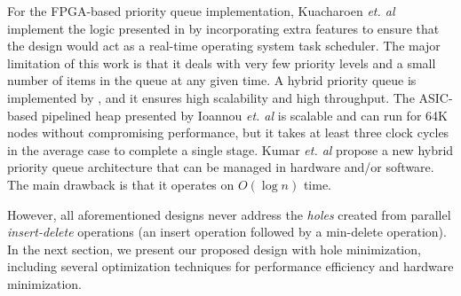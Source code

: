 For the FPGA-based priority queue implementation, Kuacharoen {\it et. al} \cite{fpga3} implement the logic presented in \cite{hw3} by incorporating extra features to ensure that the design would act as a real-time operating system task scheduler.
The major limitation of this work is that it deals with very few priority levels and a small number of items in the queue at any given time.
A hybrid priority queue is implemented by \cite{fpga2}, and it ensures high scalability and high throughput.
The ASIC-based pipelined heap presented by Ioannou {\it et. al} \cite{fpga1} is scalable and can run for 64K nodes without compromising performance, but it takes at least three clock cycles in the average case to complete a single stage.
Kumar {\it et. al} \cite{hwsw1} propose a new hybrid priority queue architecture that can be managed in hardware and/or software.
The main drawback is that it operates on $O(\log n)$ time.

However, all aforementioned designs never address the {\it holes} created from parallel {\it insert-delete} operations (an insert operation followed by a min-delete operation).
In the next section, we present our proposed design with hole minimization, including several optimization techniques for performance efficiency and hardware minimization.
